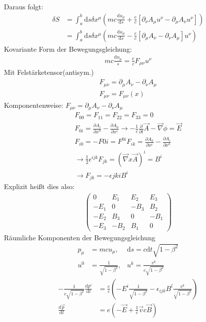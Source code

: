 \documentclass[a4paper]{article}
\begin{document}
Daraus folgt:
\begin{align}
\delta S &= \int_a^b \mathrm{d}s \delta x^\mu \left( mc\frac{\mathrm{d}u_\mu}{\mathrm{d}s} +
\frac{e}{c} \left[ \partial_\nu A_\mu u^\nu - \partial_\mu A_\nu u^\nu
\right]\right)\\
&=\int_a^b \mathrm{d}s \delta x^\mu \left( mc\frac{\mathrm{d}u_\mu}{\mathrm{d}s} -
\frac{e}{c} \left[ \partial_\mu A_\nu - \partial_\nu A_\mu \right] u^\nu
\right)
\end{align}
Kovariante Form der Bewegungsgleichung:
\begin{align}
mc\frac{\mathrm{d}u_\mu}{s}=\frac{e}{c}F_{\mu\nu}u^\nu
\end{align}
Mit Felstärketensor(antisym.)
\begin{align}
F_{\mu\nu}=\partial_\mu A_\nu - \partial_\nu A_\mu\\
F_{\mu\nu}=F_{\mu\nu}(x)
\end{align}
Komponentenweise: $F_{\mu\nu}=\partial_\mu A_\nu - \partial_\nu A_\mu$\\
\begin{align}
F_{00}=F_{11}=F_{22}=F_{33}=0\\
F_{0i}=\frac{\partial A_i}{\partial x^0}-\frac{\partial A_0}{\partial x^i}
\rightarrow -\frac{1}{c}\frac{\partial}{\partial
t}\vec{A}-\vec{\nabla}\phi=\vec{E}\\
F_{i0}=-F{0i}=F^{0i}
F_{ik}=\frac{\partial A_k}{\partial x^i}-\frac{\partial A_i}{\partial x^k}\\
\rightarrow \frac{1}{2}\epsilon^{ijk}F_{jk}=(\vec{\nabla}x\vec{A})^i=B^i\\
\rightarrow F_{jk}=-\epsilon{jki}B^i
\end{align}
Explizit heißt dies also:
\begin{align}
\begin{pmatrix}
0 & E_1 & E_2 & E_3\\
-E_1 &0&-B_3&B_2 \\
-E_2 &B_3&0&-B_1\\
-E_3 &-B_2&B_1&0
\end{pmatrix}
\end{align}
Räumliche Komponenten der Bewegungsgleichung
\begin{align}
p_\mu&=mcu_\mu , &\mathrm{d}s=c\mathrm{d}t\sqrt{1-\beta^2}\\
u^0&=\frac{1}{\sqrt{1-\beta^2}} , &u^k=\frac{v^k}{c\sqrt{1-\beta^2}}
\end{align}
\begin{align}
-\frac{1}{c\sqrt{1-\beta^2}}\frac{\mathrm{d}p^i}{\mathrm{d}t}&=\frac{e}{c}\left(-E^i
\frac{1}{\sqrt{1-\beta^2}}-\epsilon_{ijk}B^l\frac{v^k}{\sqrt{1-\beta^2}}\right)\\
\frac{\mathrm{d}\vec{p}}{\mathrm{d}t}&=e\left(-\vec{E}+\frac{1}{c}\vec{v}c\vec{B}\right)
\end{align}
\end{document}

